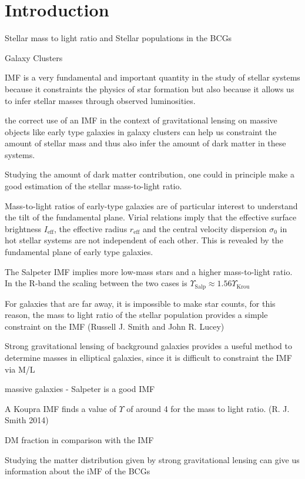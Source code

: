 \chapter{Introduction}

Stellar mass to light ratio and Stellar populations in the BCGs

Galaxy Clusters

IMF is a very fundamental and important quantity in the study of stellar systems because it constraints the physics of star formation but also because it allows us to infer stellar masses through observed luminosities.

the correct use of an IMF in the context of gravitational lensing on massive objects like early type galaxies in galaxy clusters can help us constraint the amount of stellar mass and thus also infer the amount of dark matter in these systems.

Studying the amount of dark matter contribution, one could in principle make a good estimation of the stellar mass-to-light ratio.

Mass-to-light ratios of early-type galaxies are of particular interest to understand the tilt of the fundamental plane. Virial relations imply that the effective surface brightness $I_{\text{eff}}$, the effective radius $r_{\text{eff}}$ and the central velocity dispersion $\sigma_{0}$ in hot stellar systems are not independent of each other. This is revealed by the fundamental plane of early type galaxies.

The Salpeter IMF implies more low-mass stars and a higher mass-to-light ratio. In the R-band the scaling between the two cases is $\Upsilon_{\text{Salp}}\approx 1.56\Upsilon_{\text{Krou}}$

For galaxies that are far away, it is impossible to make star counts, for this reason, the mass to light ratio of the stellar population provides a simple constraint on the IMF (Russell J. Smith and John R. Lucey) 

Strong gravitational lensing of background galaxies provides a useful method to determine masses in elliptical galaxies, since it is difficult to constraint the IMF via M/L

massive galaxies - Salpeter is a good IMF

A Koupra IMF finds a value of $\Upsilon$ of around 4 for the mass to light ratio. (R. J. Smith 2014) 

DM fraction in comparison with the IMF 

Studying the matter distribution given by strong gravitational lensing can give us information about the iMF of the BCGs

